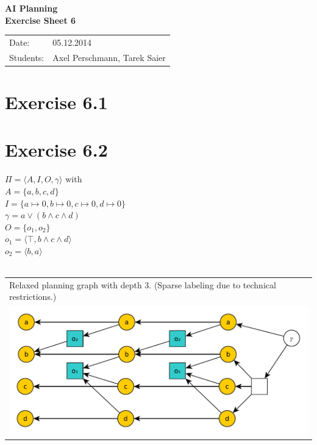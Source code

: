 \documentclass[11pt,a4paper]{article}
\begin{document}
\begin{center}
\Huge{\textbf{AI Planning}}\\
\LARGE{\textbf{Exercise Sheet 6}}
\end{center}
\vspace{2cm}
\begin{tabular}{ll}
Date: & 05.12.2014\\
Students: & Axel Perschmann, Tarek Saier
\end{tabular}

\section*{Exercise 6.1}

\section*{Exercise 6.2}
$\Pi = \langle A,I,O,\gamma \rangle$ with\\
$A = \{a,b,c,d\}$\\
$I = \{a\mapsto 0,b\mapsto 0,c\mapsto 0,d\mapsto 0\}$\\
$\gamma = a\lor (b\land c\land d)$\\
$O=\{o_1,o_2\}$\\
$o_1=\langle \top, b\land c\land d\rangle$\\
$o_2=\langle b, a\rangle$\\
\\
\begin{tabular}{l} %
Relaxed planning graph with depth 3. (Sparse labeling due to technical restrictions.)\\
\includegraphics[scale=0.5]{g62}\\
\end{tabular}\\
\end{document}
